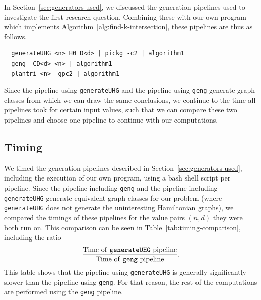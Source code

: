 In Section~\ref{sec:generators-used}, we discussed the generation pipelines used to investigate the first research question. Combining these with our own program which implements Algorithm~\ref{alg:find-k-intersection}, these pipelines are thus as follows.
\begin{verbatim}
  generateUHG <n> H0 D<d> | pickg -c2 | algorithm1
  geng -CD<d> <n> | algorithm1
  plantri <n> -gpc2 | algorithm1
\end{verbatim}
Since the pipeline using \texttt{generateUHG} and the pipeline using \texttt{geng} generate graph classes from which we can draw the same conclusions, we continue to the time all pipelines took for certain input values, such that we can compare these two pipelines and choose one pipeline to continue with our computations.

\subsection{Timing}
\label{sec:1-timing}

We timed the generation pipelines described in Section~\ref{sec:generators-used}, including the execution of our own program, using a bash shell script per pipeline. Since the pipeline including \texttt{geng} and the pipeline including \texttt{generateUHG} generate equivalent graph classes for our problem (where \texttt{generateUHG} does not generate the uninteresting Hamiltonian graphs), we compared the timings of these pipelines for the value pairs $(n, d)$ they were both run on. This comparison can be seen in Table~\ref{tab:timing-comparison}, including the ratio
$$\frac{\text{Time of \texttt{generateUHG} pipeline}}{\text{Time of \texttt{geng} pipeline}}.
$$ 
This table shows that the pipeline using \texttt{generateUHG} is generally significantly slower than the pipeline using \texttt{geng}. For that reason, the rest of the computations are performed using the \texttt{geng} pipeline.

